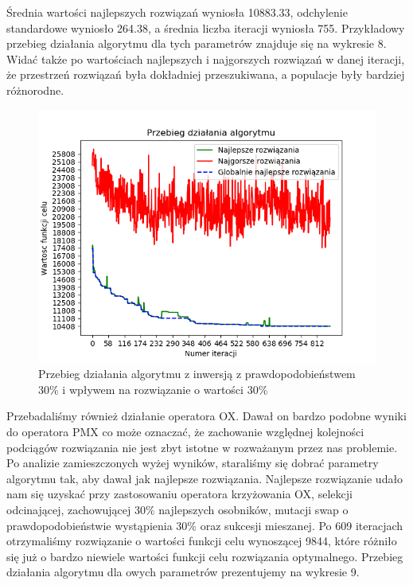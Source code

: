 \documentclass[12pt]{article}
\begin{document}
Średnia wartości najlepszych rozwiązań wyniosła 10883.33, odchylenie standardowe wyniosło 264.38, a średnia liczba iteracji wyniosła 755. Przykładowy przebieg działania algorytmu dla tych parametrów znajduje się na wykresie 8. Widać także po wartościach najlepszych i najgorszych rozwiązań w danej iteracji, że przestrzeń rozwiązań była dokładniej przeszukiwana, a populacje były bardziej różnorodne.
\begin{figure}[H]
\caption{Przebieg działania algorytmu z inwersją z prawdopodobieństwem 30\% i wpływem na rozwiązanie o wartości 30\%}
\includegraphics[scale=1]{inversion_30_percent_v2.png}
\end{figure}
\par
Przebadaliśmy również działanie operatora OX. Dawał on bardzo podobne wyniki do operatora PMX co może oznaczać, że zachowanie względnej kolejności podciągów rozwiązania nie jest zbyt istotne w rozważanym przez nas problemie. Po analizie zamieszczonych wyżej wyników, staraliśmy się dobrać parametry algorytmu tak, aby dawał jak najlepsze rozwiązania. Najlepsze rozwiązanie udało nam się uzyskać przy zastosowaniu operatora krzyżowania OX, selekcji odcinającej, zachowującej 30\% najlepszych osobników, mutacji swap o prawdopodobieństwie wystąpienia 30\% oraz sukcesji mieszanej. Po 609 iteracjach otrzymaliśmy rozwiązanie o wartości funkcji celu wynoszącej 9844, które różniło się już o bardzo niewiele wartości funkcji celu rozwiązania optymalnego. Przebieg działania algorytmu dla owych parametrów prezentujemy na wykresie 9.
\end{document}

